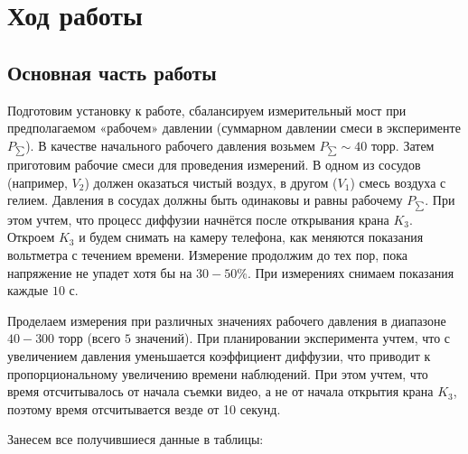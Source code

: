 \documentclass[a4paper,11.5pt]{article} %
\begin{document}
\newpage

\section{Ход работы}
\subsection{Основная часть работы}

Подготовим установку к работе, сбалансируем измерительный мост при предполагаемом «рабочем» давлении (суммарном давлении смеси в эксперименте $P_{\sum}$). В качестве начального рабочего давления возьмем $P_{\sum} \sim 40$ торр. Затем приготовим рабочие смеси для проведения измерений. В одном из сосудов (например, $V_2$) должен оказаться чистый воздух, в другом ($V_1$) смесь воздуха с гелием. Давления в сосудах должны быть одинаковы и равны рабочему $P_{\sum}$. При этом учтем, что процесс диффузии начнётся после открывания крана $K_3$. Откроем $K_3$ и будем снимать на камеру телефона, как меняются показания вольтметра с течением времени. Измерение продолжим до тех пор, пока напряжение не упадет хотя бы на $30-50\%$. При измерениях снимаем показания каждые $10$ с. 

Проделаем измерения при различных значениях рабочего давления в диапазоне $40-300$ торр (всего $5$ значений). При планировании эксперимента учтем, что с увеличением давления уменьшается коэффициент диффузии, что приводит к пропорциональному увеличению времени наблюдений. При этом учтем, что время отсчитывалось от начала съемки видео, а не от начала открытия крана $K_3$, поэтому время отсчитывается везде от 10 секунд.

Занесем все получившиеся данные в таблицы: %
\end{document}
